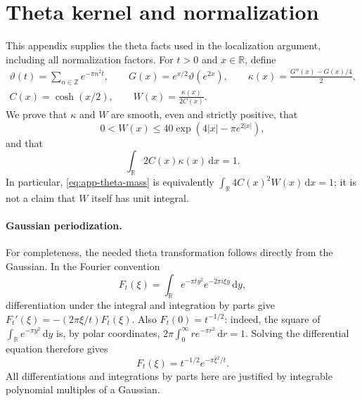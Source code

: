 \section{Theta kernel and normalization}
\label{app:theta}

This appendix supplies the theta facts used in the localization argument,
including all normalization factors.  For $t>0$ and $x\in\mathbb R$, define
\begin{equation}\label{eq:app-theta-definitions}
 \begin{gathered}
 \vartheta(t)=\sum_{n\in\mathbb Z}e^{-\pi n^2t},\qquad
 G(x)=e^{x/2}\vartheta(e^{2x}),\qquad
 \kappa(x)=\frac{G''(x)-G(x)/4}{2},\\
 C(x)=\cosh(x/2),\qquad W(x)=\frac{\kappa(x)}{2C(x)}.
 \end{gathered}
\end{equation}
We prove that $\kappa$ and $W$ are smooth, even and strictly positive, that
\begin{equation}\label{eq:app-theta-envelope}
 0<W(x)\le 40\exp\!\left(4|x|-\pi e^{2|x|}\right),
\end{equation}
and that
\begin{equation}\label{eq:app-theta-mass}
 \int_{\mathbb R}2C(x)\kappa(x)\,\mathrm dx=1.
\end{equation}
In particular, \eqref{eq:app-theta-mass} is equivalently
$\int_{\mathbb R}4C(x)^2W(x)\,\mathrm dx=1$; it is not a claim that
$W$ itself has unit integral.

\paragraph{Gaussian periodization.}
For completeness, the needed theta transformation follows directly from
the Gaussian.  In the Fourier convention
\[
 F_t(\xi)=\int_{\mathbb R}e^{-\pi t y^2}e^{-2\pi i\xi y}\,\mathrm dy,
\]
differentiation under the integral and integration by parts give
$F_t'(\xi)=-(2\pi\xi/t)F_t(\xi)$.  Also $F_t(0)=t^{-1/2}$: indeed,
the square of $\int_{\mathbb R}e^{-\pi y^2}\,\mathrm dy$ is, by polar
coordinates,
$2\pi\int_0^\infty r e^{-\pi r^2}\,\mathrm dr=1$.
Solving the differential equation therefore gives
\begin{equation}\label{eq:app-gaussian-fourier}
 F_t(\xi)=t^{-1/2}e^{-\pi\xi^2/t}.
\end{equation}
All differentiations and integrations by parts here are justified by
integrable polynomial multiples of a Gaussian.

